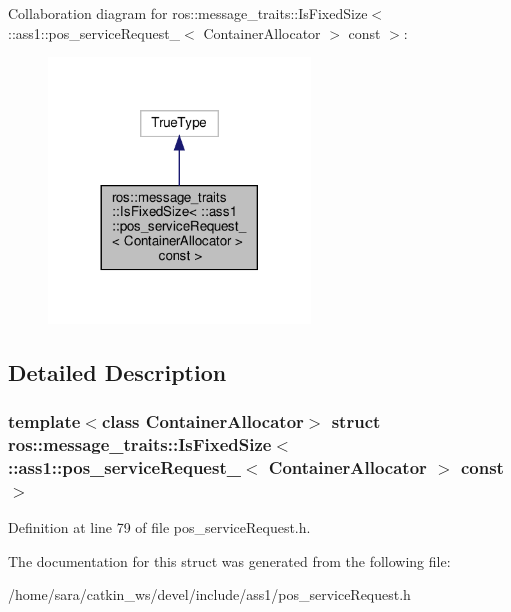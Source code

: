 Collaboration diagram for ros\+:\+:message\+\_\+traits\+:\+:Is\+Fixed\+Size$<$ \+:\+:ass1\+:\+:pos\+\_\+service\+Request\+\_\+$<$ Container\+Allocator $>$ const $>$\+:
\nopagebreak
\begin{figure}[H]
\begin{center}
\leavevmode
\includegraphics[width=197pt]{structros_1_1message__traits_1_1IsFixedSize_3_01_1_1ass1_1_1pos__serviceRequest___3_01ContainerA6ab9ea8076ab65805bc661a2aaa174d0}
\end{center}
\end{figure}


\subsection{Detailed Description}
\subsubsection*{template$<$class Container\+Allocator$>$\newline
struct ros\+::message\+\_\+traits\+::\+Is\+Fixed\+Size$<$ \+::ass1\+::pos\+\_\+service\+Request\+\_\+$<$ Container\+Allocator $>$ const $>$}



Definition at line 79 of file pos\+\_\+service\+Request.\+h.



The documentation for this struct was generated from the following file\+:\begin{DoxyCompactItemize}
\item 
/home/sara/catkin\+\_\+ws/devel/include/ass1/pos\+\_\+service\+Request.\+h\end{DoxyCompactItemize}
